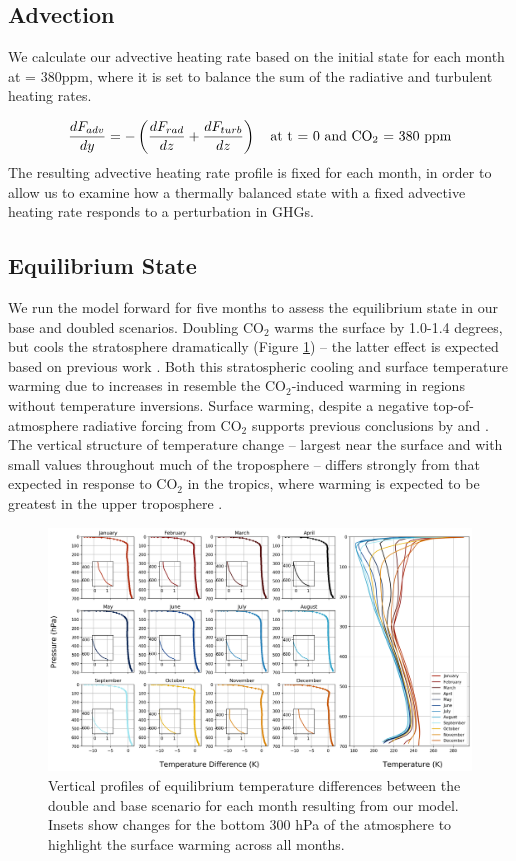 \documentclass[draft]{agujournal2019}
\begin{document}
\subsection{Advection}
We calculate our advective heating rate based on the initial state for each month at  = 380ppm, where it is set to balance the sum of the radiative and turbulent heating rates.

\begin{equation}
    \frac{dF_{adv}}{dy} = -\left( \frac{dF_{rad}}{dz} + \frac{dF_{turb}}{dz} \right)\quad \text{at t = 0 and \ce{CO_2} = 380 ppm}
\end{equation}
The resulting advective heating rate profile is fixed for each month, in order to allow us to examine how a thermally balanced state with a fixed advective heating rate responds to a perturbation in GHGs. 
\subsection{Equilibrium State}
We run the model forward for five months to assess the equilibrium state in our base and doubled  scenarios. Doubling CO$_2$ warms the surface by 1.0-1.4 degrees, but cools the stratosphere dramatically (Figure \ref{fig:temp_dif})  -- the latter effect is expected based on previous work \cite{langematz_thermal_2003}. Both this stratospheric cooling and surface temperature warming due to increases in  resemble the CO$_2$-induced warming in regions without temperature inversions. Surface warming, despite a negative top-of-atmosphere radiative forcing from CO$_2$ supports previous conclusions by  and . The vertical structure of temperature change -- largest near the surface and with small values throughout much of the troposphere -- differs strongly from that expected in response to CO$_2$ in the tropics, where warming is expected to be greatest in the upper troposphere \cite{fu_warming_2011}.

\begin{figure}[htb!]
\noindent\includegraphics[width=1\textwidth]{figures/temp_dif.png}
\centering
\caption{Vertical profiles of equilibrium temperature differences between the double and base  scenario for each month resulting from our model. Insets show changes for the bottom 300 hPa of the atmosphere to highlight the surface warming across all months.}
\label{fig:temp_dif}
\end{figure}
\end{document}
